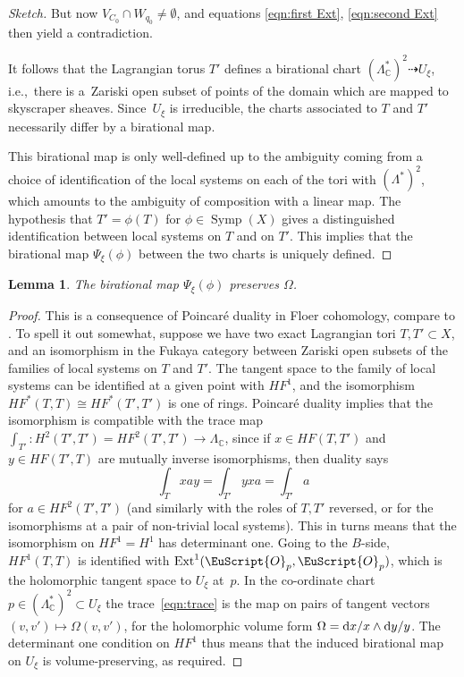 \documentclass[pdftex]{sigma}
\DeclareMathOperator{\Ext}{Ext}
\def\cO{\EuScript{O}}
\DeclareMathOperator{\Symp}{Symp}
\def\bC{\mathbb{C}}
\newtheorem{lem}[thm]{Lemma}
\theoremstyle{definition}
\numberwithin{equation}{section}
\begin{document}
\begin{proof}[Sketch]
But now $V_{C_0} \cap W_{q_0} \neq \emptyset$, and equations \eqref{eqn:first Ext}, \eqref{eqn:second Ext} then yield a contradiction.

It follows that the Lagrangian torus $T'$ defines a birational chart $(\Lambda_{\bC}^*)^2 \dashrightarrow U_{\xi}$, i.e.,~there is a~Zariski open subset of points of the domain which are mapped to skyscraper sheaves. Since~$U_{\xi}$ is irreducible, the charts associated to $T$ and $T'$ necessarily differ by a birational map.

This birational map is only well-defined up to the ambiguity coming from a choice of identification of the local systems on each of the tori with $(\Lambda^*)^2$, which amounts to the ambiguity of composition with a linear map. The hypothesis that $T'=\phi(T)$ for $\phi \in \Symp(X)$ gives a distinguished identification between local systems on $T$ and on $T'$. This implies that the birational map $\Psi_{\xi}(\phi)$ between the two charts is uniquely defined.
\end{proof}

\begin{lem}
The birational map $\Psi_{\xi}(\phi)$ preserves $\Omega$.
\end{lem}

\begin{proof} This is a consequence of Poincar\'e duality in Floer cohomology, compare to \cite[Section~11]{Seidel:categorical_dynamics}.
To spell it out somewhat, suppose we have
two exact Lagrangian tori $T, T' \subset X$, and an isomorphism in the
Fukaya category between Zariski open subsets of the families of local systems on $T$ and $T'$. The tangent space to the
family of local systems can be identified at a given point with $HF^1$, and the isomorphism
$HF^*(T,T) \cong HF^*(T',T')$ is one of rings. Poincar\'e duality implies that the isomorphism is compatible with the trace map $\int_{T'}\colon H^2(T',T') = HF^2(T',T') \to \Lambda_\bC$, since if $x \in HF(T,T')$ and $y \in HF(T',T)$
are mutually inverse isomorphisms, then duality says
\begin{equation} \label{eqn:trace}
\int_T xay = \int_{T'} yxa = \int_{T'} a
\end{equation}
for $a\in HF^2(T',T')$ (and similarly with the roles of $T,T'$ reversed, or for the isomorphisms at a pair of non-trivial local systems).
This in turns means that the isomorphism on $HF^1 = H^1$ has determinant one. Going to the $B$-side, $HF^1(T,T)$ is identified with $\Ext^1(\cO_p,\cO_p)$, which is the holomorphic tangent space to $U_{\xi}$ at~$p$. In the co-ordinate chart $p \in (\Lambda_{\bC}^*)^2 \subset U_\xi$ the trace~\eqref{eqn:trace} is the map on pairs of tangent vectors $(v,v') \mapsto \Omega(v,v')$, for the holomorphic volume form $\Omega = {\rm d}x/x \wedge {\rm d}y/y$. The determinant one condition on $HF^1$ thus means that the induced birational map on $U_\xi$ is volume-preserving, as required.
\end{proof}
\end{document}
